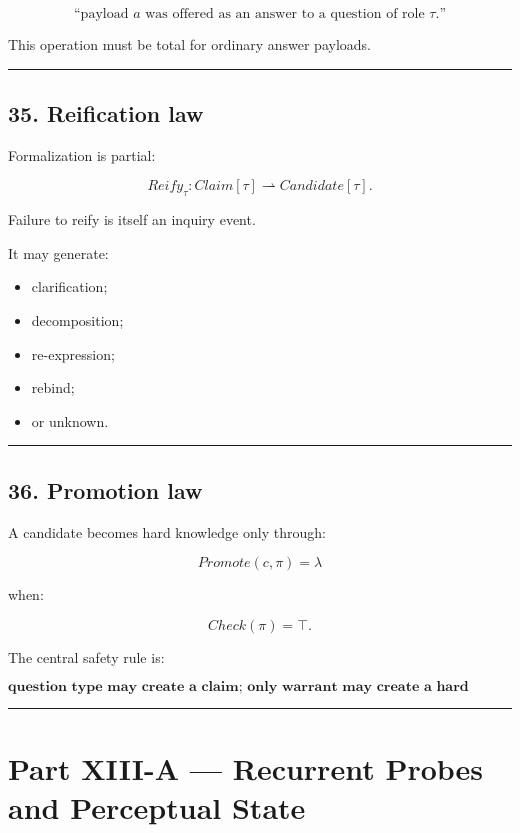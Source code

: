 \documentclass[
]{article}
\providecommand{\tightlist}{%
  \setlength{\itemsep}{0pt}\setlength{\parskip}{0pt}}
\begin{document}
\[
\boxed{
\text{“payload }a\text{ was offered as an answer to a question of role }\tau.”}
\]

This operation must be total for ordinary answer payloads.

\begin{center}\rule{0.5\linewidth}{0.5pt}\end{center}

\subsection{35. Reification law}\label{reification-law}

Formalization is partial:

\[
\boxed{
Reify_\tau
:
Claim[\tau]
\rightharpoonup
Candidate[\tau].
}
\]

Failure to reify is itself an inquiry event.

It may generate:

\begin{itemize}
\tightlist
\item
  clarification;
\item
  decomposition;
\item
  re-expression;
\item
  rebind;
\item
  or unknown.
\end{itemize}

\begin{center}\rule{0.5\linewidth}{0.5pt}\end{center}

\subsection{36. Promotion law}\label{promotion-law}

A candidate becomes hard knowledge only through:

\[
\boxed{
Promote(c,\pi)
=
\lambda
}
\]

when:

\[
Check(\pi)=\top.
\]

The central safety rule is:

\[
\boxed{
\textbf{question type may create a claim;
only warrant may create a hard lemma.}
}
\]

\begin{center}\rule{0.5\linewidth}{0.5pt}\end{center}


\section{Part XIII-A --- Recurrent Probes and Perceptual
State}\label{part-xiii-a-recurrent-probes-and-perceptual-state}
\end{document}
